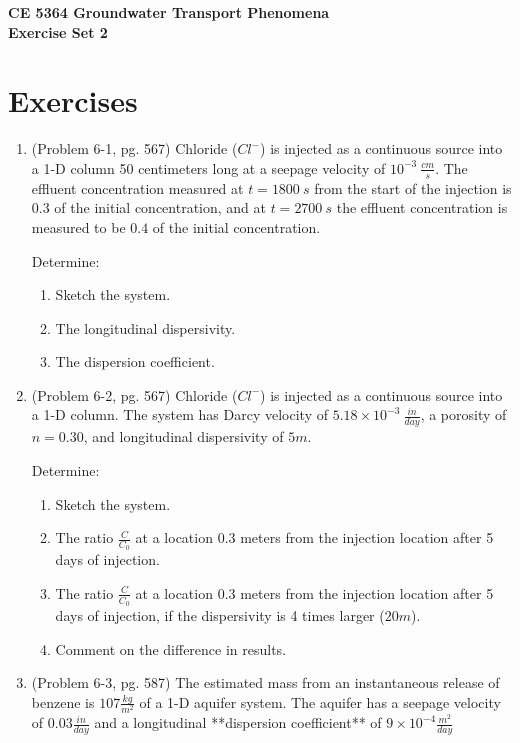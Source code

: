 \documentclass[12pt]{article}
\begin{document}
\begin{center}
{\textbf{{ CE 5364 Groundwater Transport Phenomena } \\ {Exercise Set 2}}}
\end{center}

\section*{\small{Exercises}}
\begin{enumerate}
\item (Problem 6-1, pg. 567)
Chloride ($Cl^{-}$) is injected as a continuous source into a 1-D column 50 centimeters long at a seepage velocity of $10^{-3}~\frac{cm}{s}$.  The effluent concentration measured at $t=1800~s$ from the start of the injection is $0.3$ of the initial concentration, and at $t=2700~s$ the effluent concentration is measured to be $0.4$ of the initial concentration.

Determine:
\begin{enumerate}
\item Sketch the system.
\item The longitudinal dispersivity.
\item The dispersion coefficient.
\end{enumerate}

\item (Problem 6-2, pg. 567)
Chloride ($Cl^{-}$) is injected as a continuous source into a 1-D column.
The system has Darcy velocity of $5.18 \times 10^{-3}~\frac{in}{day}$, a porosity of $n=0.30$, and longitudinal dispersivity of $5 m$.

Determine:
\begin{enumerate}
\item Sketch the system.
\item The ratio $\frac{C}{C_0}$ at a location 0.3 meters from the injection location after 5 days of injection. 
\item The ratio $\frac{C}{C_0}$ at a location 0.3 meters from the injection location after 5 days of injection, if the dispersivity is 4 times larger ($20 m$).
\item Comment on the difference in results.
\end{enumerate}

\clearpage

\item (Problem 6-3, pg. 587)
The estimated mass from an instantaneous release of benzene is $107 \frac{kg}{m^2}$ of a 1-D aquifer system. The aquifer has a seepage velocity of $0.03 \frac{in}{day}$ and a longitudinal **dispersion coefficient** of $9 \times 10^{-4}\frac{m^2}{day}$


\end{enumerate}
\end{document}

